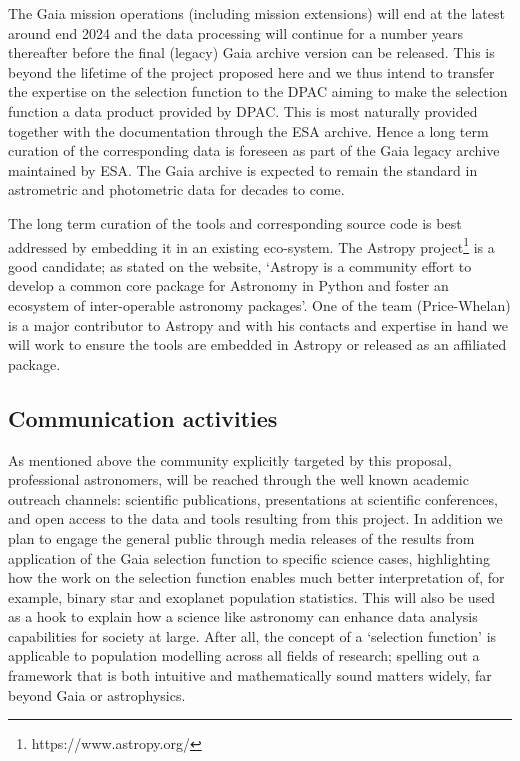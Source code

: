 The Gaia mission operations (including mission extensions) will end at the latest around end 2024 and the data processing will continue for a number years thereafter before the final (legacy) Gaia archive version can be released. This is beyond the lifetime of the project proposed here and we thus intend to transfer the expertise on the selection function to the DPAC aiming to make the selection function a data product provided by DPAC. This is most naturally provided together with the documentation through the ESA archive. Hence a long term curation of the corresponding data is foreseen as part of the Gaia legacy archive maintained by ESA. The Gaia archive is expected to remain the standard in astrometric and photometric data for decades to come. 

The long term curation of the {\acro} tools and corresponding source code is best addressed by embedding it in an existing eco-system. The Astropy project\footnote{https://www.astropy.org/} is a good candidate; as stated on the website, `Astropy is a community effort to develop a common core package for Astronomy in Python and foster an ecosystem of inter-operable astronomy packages'. One of the {\acro} team (Price-Whelan) is a major contributor to Astropy \cite{astropy2018} and with his contacts and expertise in hand we will work to ensure the {\acro} tools are embedded in Astropy or released as an affiliated package.

\subsection{Communication activities}
\label{sec:communication-activities}

As mentioned above the community explicitly targeted by this proposal, professional astronomers, will be reached through the well known academic outreach channels: scientific publications, presentations at scientific conferences, and open access to the data and tools resulting from this project. In addition we plan to engage the general public through media releases of the results from application of the Gaia selection function to specific science cases, highlighting how the work on the selection function enables much better interpretation of, for example, binary star and exoplanet population statistics. This will also be used as a hook to explain how a science like astronomy can enhance data analysis capabilities for society at large. After all, the concept of a `selection function' is applicable to population modelling across all fields of research; spelling out a framework that is both intuitive and mathematically sound matters widely, far beyond Gaia or astrophysics.
